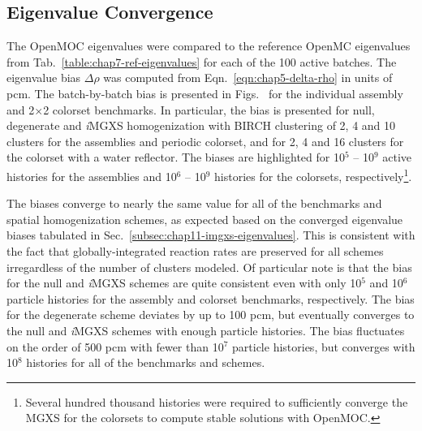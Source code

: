 \subsection{Eigenvalue Convergence}
\label{subsec:chap11-eigenvalue-converge}

The OpenMOC eigenvalues were compared to the reference OpenMC eigenvalues from Tab.~\ref{table:chap7-ref-eigenvalues} for each of the 100 active batches. The eigenvalue bias $\Delta\rho$ was computed from Eqn.~\ref{eqn:chap5-delta-rho} in units of \ac{pcm}. The batch-by-batch bias is presented in Figs.~ for the individual assembly and 2$\times$2 colorset benchmarks. In particular, the bias is presented for null, degenerate and \textit{i}\ac{MGXS} homogenization with BIRCH clustering of 2, 4 and 10 clusters for the assemblies and periodic colorset, and for 2, 4 and 16 clusters for the colorset with a water reflector. The biases are highlighted for 10$^{5}$ -- 10$^{9}$ active histories for the assemblies and 10$^{6}$ -- 10$^{9}$ histories for the colorsets, respectively\footnote{\label{converge}Several hundred thousand histories were required to sufficiently converge the \ac{MGXS} for the colorsets to compute stable solutions with OpenMOC.}.

The biases converge to nearly the same value for all of the benchmarks and spatial homogenization schemes, as expected based on the converged eigenvalue biases tabulated in Sec.~\ref{subsec:chap11-imgxs-eigenvalues}. This is consistent with the fact that globally-integrated reaction rates are preserved for all schemes irregardless of the number of clusters modeled. Of particular note is that the bias for the null and \textit{i}\ac{MGXS} schemes are quite consistent even with only 10$^{5}$ and 10$^{6}$ particle histories for the assembly and colorset benchmarks, respectively. The bias for the degenerate scheme deviates by up to 100 \ac{pcm}, but eventually converges to the null and \textit{i}\ac{MGXS} schemes with enough particle histories. The bias fluctuates on the order of 500 \ac{pcm} with fewer than 10$^{7}$ particle histories, but converges with 10$^{8}$ histories for all of the benchmarks and schemes.

